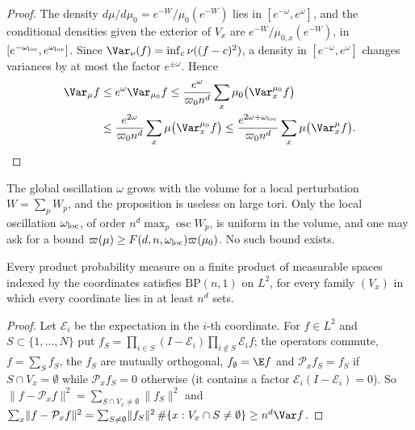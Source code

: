\begin{proof}
The density $d\mu/d\mu_0=e^{-W}/\mu_0(e^{-W})$ lies in $[e^{-\omega},e^{
\omega}]$, and the conditional densities given the exterior of $V_x$ are
$e^{-W}/\mu_{0,x}(e^{-W})$, in $[e^{-\omega_{\rm loc}},e^{\omega_{\rm
loc}}]$. Since $\Var_\nu(f)=\inf_c\nu((f-c)^2)$, a density in $[e^{-\omega},
e^\omega]$ changes variances by at most the factor $e^{\pm\omega}$. Hence
\begin{align*}
\Var_\mu f&\le e^\omega\Var_{\mu_0}f\le\frac{e^\omega}{\varpi_0n^d}\sum_x\mu_0
\bigl(\Var^{\mu_0}_xf\bigr)\\
&\le\frac{e^{2\omega}}{\varpi_0n^d}\sum_x\mu\bigl(\Var^{\mu_0}_xf\bigr)
\le\frac{e^{2\omega+\omega_{\rm loc}}}{\varpi_0n^d}\sum_x\mu\bigl(\Var^\mu_xf\bigr).
\end{align*}
\end{proof}

The global oscillation $\omega$ grows with the volume for a local
perturbation $W=\sum_pW_p$, and the proposition is useless on large tori.
Only the local oscillation $\omega_{\rm loc}$, of order $n^d\max_p
\operatorname{osc}W_p$, is uniform in the volume, and one may ask for a bound
$\varpi(\mu)\ge F(d,n,\omega_{\rm loc})\varpi(\mu_0)$. No such bound exists.

\begin{proposition}\label{prop:rSproduct}
Every product probability measure on a finite product of measurable spaces
indexed by the coordinates satisfies $\mathrm{BP}(n,1)$ on $L^2$, for every
family $(V_x)$ in which every coordinate lies in at least $n^d$ sets.
\end{proposition}

\begin{proof}
Let $\mathcal E_i$ be the expectation in the $i$-th coordinate. For $f\in
L^2$ and $S\subset\{1,\dots,N\}$ put $f_S=\prod_{i\in S}(I-\mathcal E_i)
\prod_{i\notin S}\mathcal E_if$; the operators commute, $f=\sum_Sf_S$, the
$f_S$ are mutually orthogonal, $f_\emptyset=\E f$ and $\mathcal P_xf_S=f_S$
if $S\cap V_x=\emptyset$ while $\mathcal P_xf_S=0$ otherwise (it contains a
factor $\mathcal E_i(I-\mathcal E_i)=0$). So $\lVert f-\mathcal P_xf\rVert^2
=\sum_{S\cap V_x\ne\emptyset}\lVert f_S\rVert^2$ and $\sum_x\lVert f-\mathcal
P_xf\rVert^2=\sum_{S\ne\emptyset}\lVert f_S\rVert^2\,\#\{x:V_x\cap S\ne
\emptyset\}\ge n^d\Var f$.
\end{proof}

